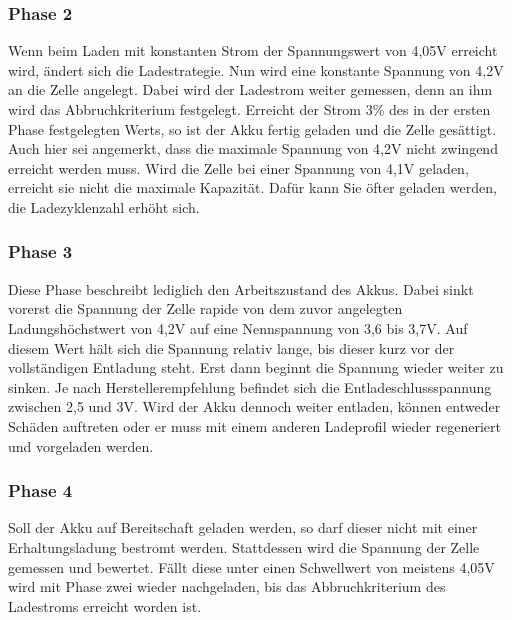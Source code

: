 \documentclass[12pt]{scrreprt} %
\begin{document}
\subsubsection{Phase 2}
Wenn beim Laden mit konstanten Strom der Spannungswert von 4,05V erreicht wird, ändert sich die Ladestrategie. Nun wird eine konstante Spannung von 4,2V an die Zelle angelegt. Dabei wird der Ladestrom weiter gemessen, denn an ihm wird das Abbruchkriterium festgelegt. Erreicht der Strom 3\% des in der ersten Phase festgelegten Werts, so ist der Akku fertig geladen und die Zelle gesättigt. Auch hier sei angemerkt, dass die maximale Spannung von 4,2V nicht zwingend erreicht werden muss. Wird die Zelle bei einer Spannung von 4,1V geladen, erreicht sie nicht die maximale Kapazität. Dafür kann Sie öfter geladen werden, die Ladezyklenzahl erhöht sich.
\subsubsection{Phase 3}
Diese Phase beschreibt lediglich den Arbeitszustand des Akkus. Dabei sinkt vorerst die Spannung der Zelle rapide von dem zuvor angelegten Ladungshöchstwert von 4,2V auf eine Nennspannung von 3,6 bis 3,7V.  Auf diesem Wert hält sich die Spannung relativ lange, bis dieser kurz vor der vollständigen Entladung steht. Erst dann beginnt die Spannung wieder weiter zu sinken. Je nach Herstellerempfehlung befindet sich die Entladeschlussspannung zwischen 2,5 und 3V. Wird der Akku dennoch weiter entladen, können entweder Schäden auftreten oder er muss mit einem anderen Ladeprofil wieder regeneriert und vorgeladen werden.
\subsubsection{Phase 4}
Soll der Akku auf Bereitschaft geladen werden, so darf dieser nicht mit einer Erhaltungsladung bestromt werden. Stattdessen wird die Spannung der Zelle gemessen und bewertet. Fällt diese unter einen Schwellwert von meistens 4,05V wird mit Phase zwei wieder nachgeladen, bis das Abbruchkriterium des Ladestroms erreicht worden ist.
\end{document}
